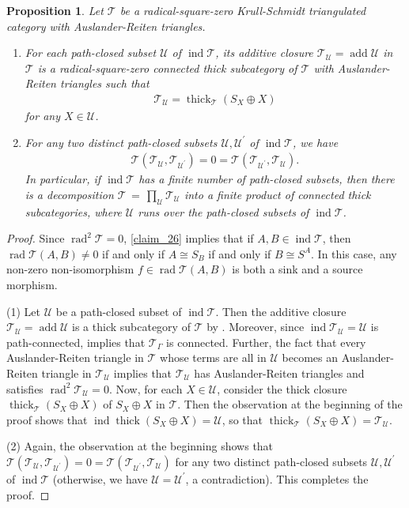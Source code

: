 \documentclass[12pt]{amsart}
\numberwithin{equation}{subsection}
\theoremstyle{plain}
\newtheorem{proposition}[theorem]{Proposition}
\theoremstyle{definition}
\newcommand{\rad}{\operatorname{rad}}
\newcommand{\add}{\operatorname{add}}
\newcommand{\ind}{\operatorname{ind}}
\newcommand{\thick}{\operatorname{thick}}
\newcommand{\G}{\Gamma}
\newcommand{\T}{\mathcal{T}}
\newcommand{\U}{\mathcal{U}}
\begin{document}
\begin{proposition}\label{claim_40}
Let $\T$ be a radical-square-zero Krull-Schmidt triangulated category with Auslander-Reiten triangles.
\begin{enumerate}
\item For each path-closed subset $\U$ of $\ind\T$, its additive closure $\T_\U=\add\U$ in $\T$ is a radical-square-zero connected thick subcategory of $\T$ with Auslander-Reiten triangles such that  
\begin{align}
    \T_\U = \thick_\T(S_X\oplus X)
\end{align}
for any $X\in\U$. 
\item For any two distinct path-closed subsets $\U, \U^\prime$ of $\ind\T$, we have 
\begin{align}
    \T(\T_{\U}, \T_{\U^\prime}) =0= \T(\T_{\U^\prime}, \T_{\U}).
\end{align}
In particular, if $\ind\T$ has a finite number of path-closed subsets, then there is a decomposition $\T\,=\,\prod_{\U}\T_\U$ into a finite product of connected thick subcategories, where $\U$ runs over the path-closed subsets of $\ind\T$.
\end{enumerate}
\end{proposition}
\begin{proof}
Since $\rad^2\T=0$, \cref{claim_26} implies that if $A, B \in\ind\T$, then $\rad\T(A, B) \neq 0$ if and only if $A\cong S_B$ if and only if  $B\cong S^A$.
In this case, any non-zero non-isomorphism $f\in \rad\T(A, B)$ is both a sink and a source morphism.




(1) Let $\U$ be a path-closed subset of $\ind\T$.
Then the additive closure $\T_\U=\add\U$ is a thick subcategory of $\T$ by \cite[Lemma 4.1]{Chen-Ringel_2018}.
Moreover, since $\ind\T_\U = \U$ is path-connected, \cite[Proposition 4.2]{Chen-Ringel_2018} implies that $\T_\G$ is connected.
Further, the fact that every Auslander-Reiten triangle in $\T$ whose terms are all in $\U$ becomes an Auslander-Reiten triangle in $\T_\U$ implies that $\T_\U$ has Auslander-Reiten triangles and satisfies $\rad^2\T_\U=0$.
Now, for each $X\in\U$, consider the thick closure $\thick_\T(S_X\oplus X)$ of $S_X\oplus X$ in $\T$.
Then the observation at the beginning of the proof shows that $\ind\thick(S_X\oplus X)=\U$, so that $\thick_\T(S_X\oplus X)=\T_\U$.





(2) Again, the observation at the beginning shows that  $\T(\T_\U, \T_{\U^\prime}) =0= \T(\T_{\U^\prime}, \T_\U)$ for any two distinct path-closed subsets $\U, \U^\prime$ of $\ind\T$ (otherwise, we have $\U=\U^\prime$, a contradiction).
This completes the proof.
\end{proof}
\end{document}
